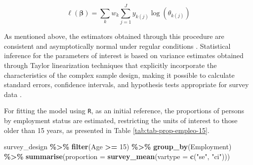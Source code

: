 \documentclass[
  english,
  12pt,
]{book}
\newenvironment{Shaded}{\begin{snugshade}}{\end{snugshade}}
\newcommand{\AttributeTok}[1]{\textcolor[rgb]{0.13,0.29,0.53}{#1}}
\newcommand{\DecValTok}[1]{\textcolor[rgb]{0.00,0.00,0.81}{#1}}
\newcommand{\FunctionTok}[1]{\textcolor[rgb]{0.13,0.29,0.53}{\textbf{#1}}}
\newcommand{\NormalTok}[1]{#1}
\newcommand{\SpecialCharTok}[1]{\textcolor[rgb]{0.81,0.36,0.00}{\textbf{#1}}}
\newcommand{\StringTok}[1]{\textcolor[rgb]{0.31,0.60,0.02}{#1}}
\begin{document}
\[
\ell(\boldsymbol{\beta})
=
\sum_{k} w_k
\sum_{j=1}^{J}
y_{k(j)}
\log(\theta_{k(j)})
\]

As mentioned above, the estimators obtained through this procedure are consistent and asymptotically normal under regular conditions \citep{molina1992pseudo}. Statistical inference for the parameters of interest is based on variance estimates obtained through Taylor linearization techniques that explicitly incorporate the characteristics of the complex sample design, making it possible to calculate standard errors, confidence intervals, and hypothesis tests appropriate for survey data \citep{binder1983variances}.

For fitting the model using \texttt{R}, as an initial reference, the proportions of persons by employment status are estimated, restricting the units of interest to those older than 15 years, as presented in Table \ref{tab:tab-prop-empleo-15}.

\begin{Shaded}
\begin{Highlighting}[]
\NormalTok{survey\_design }\SpecialCharTok{\%\textgreater{}\%}
  \FunctionTok{filter}\NormalTok{(Age }\SpecialCharTok{\textgreater{}=} \DecValTok{15}\NormalTok{) }\SpecialCharTok{\%\textgreater{}\%}
  \FunctionTok{group\_by}\NormalTok{(Employment) }\SpecialCharTok{\%\textgreater{}\%}
  \FunctionTok{summarise}\NormalTok{(}\AttributeTok{proportion =} \FunctionTok{survey\_mean}\NormalTok{(}\AttributeTok{vartype =} \FunctionTok{c}\NormalTok{(}\StringTok{"se"}\NormalTok{, }\StringTok{"ci"}\NormalTok{)))}
\end{Highlighting}
\end{Shaded}
\end{document}
